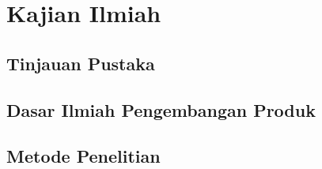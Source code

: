 \chapter{Kajian Ilmiah}

\section{Tinjauan Pustaka}

\section{Dasar Ilmiah Pengembangan Produk}

\section{Metode Penelitian}
